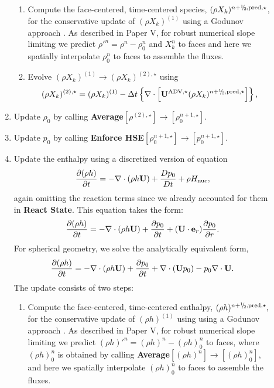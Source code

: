 \documentclass{aastex62}
\newcommand{\sfrac}[2]{\mathchoice
  {\kern0em\raise.5ex\hbox{\the\scriptfont0 #1}\kern-.15em/
   \kern-.15em\lower.25ex\hbox{\the\scriptfont0 #2}}
  {\kern0em\raise.5ex\hbox{\the\scriptfont0 #1}\kern-.15em/
   \kern-.15em\lower.25ex\hbox{\the\scriptfont0 #2}}
  {\kern0em\raise.5ex\hbox{\the\scriptscriptfont0 #1}\kern-.2em/
   \kern-.15em\lower.25ex\hbox{\the\scriptscriptfont0 #2}}
  {#1\!/#2}}
\newcommand{\myhalf}{\sfrac{1}{2}}
\newcommand{\eb}{{\bf{e}}}
\newcommand{\Ub}{{\bf{U}}}
\newcommand{\dt}{\Delta t}
\newcommand{\Hnuc}{H_{\rm nuc}}
\newcommand{\pred}{{\rm pred}}
\newcommand{\nph}{{n+\myhalf}}
\newcommand{\uadvone}{\Ub^{\mathrm{ADV},\star}}
\begin{document}
\begin{description}
\begin{enumerate}
\begin{enumerate}
\item Compute the face-centered, time-centered species, $(\rho X_k)^{\nph,\pred,\star}$,
  for the conservative update of $(\rho X_k)^{(1)}$ using a Godunov approach \citep{XRB_III}.
  As described in Paper V, for robust numerical slope limiting we predict 
  $\rho'^n=\rho^n-\rho_0^n$ and $X_k^n$ to faces
  and here we spatially interpolate $\rho_0^n$ to faces to assemble the fluxes.

\item Evolve $(\rho X_k)^{(1)} \rightarrow (\rho X_k)^{(2),\star}$ using
\begin{equation}
(\rho X_k)^{(2),\star} = (\rho X_k)^{(1)}
  - \dt \left\{ \nabla \cdot \left[ \uadvone (\rho X_k)^{\nph,\pred,\star} \right] \right\},
\end{equation}

\end{enumerate}

\item Update $\rho_0$ by calling {\bf Average}$[\rho^{(2),\star}]\rightarrow[\rho_0^{n+1,\star}]$.

\item Update $p_0$ by calling {\bf Enforce HSE}$[\rho_0^{n+1,\star}] \rightarrow [p_0^{n+1,\star}]$.

\item Update the enthalpy using a discretized version of equation
%
\begin{equation}
\frac{\partial(\rho h)}{\partial t} = -\nabla\cdot(\rho h\Ub) + \frac{Dp_0}{Dt} + \rho\Hnuc,
\end{equation}
%
again omitting the reaction terms since we already accounted for
them in {\bf React State}.  This equation takes the form:
\begin{equation}
\frac{\partial (\rho h)}{\partial t}  = - \nabla \cdot (\rho h\Ub) + \frac{\partial p_0}{\partial t} + (\Ub \cdot \eb_r) \frac{\partial p_0}{\partial r}.
\end{equation}
For spherical geometry, we solve the analytically equivalent form,
\begin{equation}
\frac{\partial (\rho h)}{\partial t}  = - \nabla \cdot (\rho h\Ub) + \frac{\partial p_0}{\partial t} + \nabla \cdot (\Ub p_0) - p_0 \nabla \cdot \Ub.
\end{equation}
The update consists of two steps:

\begin{enumerate}
\renewcommand{\labelenumii}{{\bf \roman{enumii}}.}

\item Compute the face-centered, time-centered enthalpy, $(\rho h)^{\nph,\pred,\star},$
  for the conservative update of $(\rho h)^{(1)}$ using using a Godunov approach \citep{XRB_III}.
  As described in Paper V, for robust numerical slope limiting 
  we predict $(\rho h)'^n=(\rho h)^n-(\rho h)_0^n$ to faces,
  where $(\rho h)_0^n$ is obtained by calling {\bf Average}$[(\rho h)^n]\rightarrow[(\rho h)_0^n]$,
  and here we spatially interpolate $(\rho h)_0^n$ to faces to assemble the fluxes.


\end{enumerate}
\end{enumerate}
\end{description}
\end{document}
